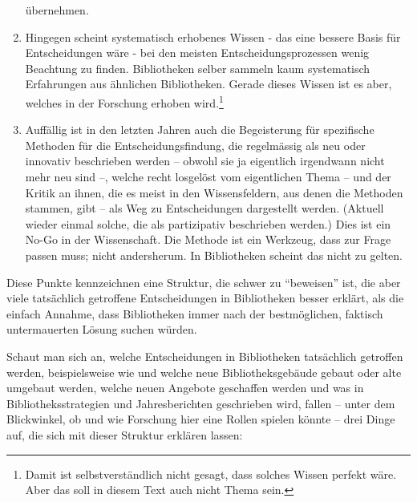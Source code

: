 \documentclass[a4paper,
fontsize=11pt,
oneside,
numbers=noperiodatend,
parskip=half-,
bibliography=totoc,
final
]{scrartcl}
\begin{document}
\begin{enumerate}
  übernehmen.
\item
  Hingegen scheint systematisch erhobenes Wissen - das eine bessere
  Basis für Entscheidungen wäre - bei den meisten Entscheidungsprozessen
  wenig Beachtung zu finden. Bibliotheken selber sammeln kaum
  systematisch Erfahrungen aus ähnlichen Bibliotheken. Gerade dieses
  Wissen ist es aber, welches in der Forschung erhoben wird.\footnote{Damit
    ist selbstverständlich nicht gesagt, dass solches Wissen perfekt
    wäre. Aber das soll in diesem Text auch nicht Thema sein.}
\item
  Auffällig ist in den letzten Jahren auch die Begeisterung für
  spezifische Methoden für die Entscheidungsfindung, die regelmässig als
  neu oder innovativ beschrieben werden -- obwohl sie ja eigentlich
  irgendwann nicht mehr neu sind --, welche recht losgelöst vom
  eigentlichen Thema -- und der Kritik an ihnen, die es meist in den
  Wissensfeldern, aus denen die Methoden stammen, gibt -- als Weg zu
  Entscheidungen dargestellt werden. (Aktuell wieder einmal solche, die
  als partizipativ beschrieben werden.) Dies ist ein No-Go in der
  Wissenschaft. Die Methode ist ein Werkzeug, dass zur Frage passen
  muss; nicht andersherum. In Bibliotheken scheint das nicht zu gelten.
\end{enumerate}

Diese Punkte kennzeichnen eine Struktur, die schwer zu
\enquote{beweisen} ist, die aber viele tatsächlich getroffene
Entscheidungen in Bibliotheken besser erklärt, als die einfach Annahme,
dass Bibliotheken immer nach der bestmöglichen, faktisch untermauerten
Lösung suchen würden.

Schaut man sich an, welche Entscheidungen in Bibliotheken tatsächlich
getroffen werden, beispielsweise wie und welche neue Bibliotheksgebäude
gebaut oder alte umgebaut werden, welche neuen Angebote geschaffen
werden und was in Bibliotheksstrategien und Jahresberichten geschrieben
wird, fallen -- unter dem Blickwinkel, ob und wie Forschung hier eine
Rollen spielen könnte -- drei Dinge auf, die sich mit dieser Struktur
erklären lassen:
\end{document}
